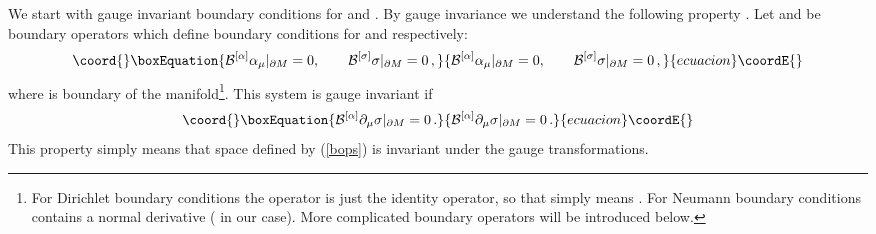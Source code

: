 \documentclass[a4paper,12pt]{article}
\begin{document}
We start with gauge invariant boundary conditions for \myHighlight{$\alpha_\mu$}\coordHE{}
and \myHighlight{$\sigma$}\coordHE{}. By gauge invariance we understand the following property
\cite{Vassilevich:1997iz}. Let \coordHE{} and 
\coordHE{} be boundary operators which define boundary conditions
for \myHighlight{$\alpha$}\coordHE{} and \myHighlight{$\sigma$}\coordHE{} respectively:
\begin{equation}\coord{}\boxEquation{
{\cal B}^{[\alpha]} \alpha_\mu |_{\partial M}=0,\qquad
{\cal B}^{[\sigma]} \sigma |_{\partial M}=0 \,,\label{bops}
}{
{\cal B}^{[\alpha]} \alpha_\mu |_{\partial M}=0,\qquad
{\cal B}^{[\sigma]} \sigma |_{\partial M}=0 \,,}{ecuacion}\coordE{}\end{equation}
where \coordHE{} is boundary of the manifold\footnote{For Dirichlet
boundary conditions the operator \coordHE{} is just the identity operator,
so that \coordHE{} simply means 
\coordHE{}. For Neumann boundary conditions \coordHE{}
contains a normal derivative (\coordHE{} in our case). More complicated
boundary operators will be introduced below.}. 
This system is gauge invariant if 
\begin{equation}\coord{}\boxEquation{
{\cal B}^{[\alpha]} \partial_\mu \sigma |_{\partial M}=0 \,.
\label{gauinv}
}{
{\cal B}^{[\alpha]} \partial_\mu \sigma |_{\partial M}=0 \,.
}{ecuacion}\coordE{}\end{equation}
This property simply means that space defined by (\ref{bops}) is invariant
under the gauge transformations.
\end{document}
